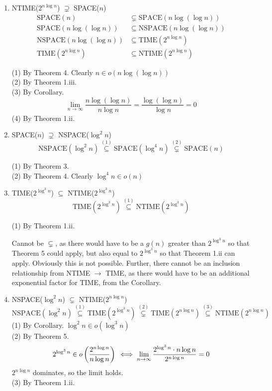 \documentclass[a4paper]{article}
\begin{document}
\begin{enumerate}[label=(\alph*)]
	\item NTIME($2^{n \log n}$) $\supsetneq$ SPACE($n$)
		\begin{align}
		\text{SPACE}(n) &\subsetneq \text{SPACE}(n\log(\log n))\\%
		\text{SPACE}(n\log(\log n))	&\subseteq \text{NSPACE}(n\log(\log n))\\%
		\text{NSPACE}(n\log(\log n)) &\subseteq \text{TIME}(2^{n\log n})\\%
		\text{TIME}(2^{n\log n}) &\subseteq \text{NTIME}(2^{n\log n})%
		\end{align}

		(1) By Theorem 4. Clearly $n \in o(n\log(\log n))$\\
		(2) By Theorem 1.iii. \\
		(3) By Corollary.
		$$
		\lim_{n \to \infty} \frac{n\log(\log n)}{n\log n} 
		= \frac{\log(\log n)}{\log n} = 0
		$$
		(4) By Theorem 1.ii.

	\item SPACE($n$) $\supsetneq$ NSPACE($\log^{2} n$)
		$$
		\text{NSPACE}(\log^2n) \overset{(1)}{\subseteq} \text{SPACE}(\log^4n)
		\overset{(2)}{\subsetneq} \text{SPACE}(n)
		$$

		(1) By Theorem 3. \\
		(2) By Theorem 4. Clearly $\log^4n \in o(n)$

	\item TIME($2^{\log^{3}n}$) $\subseteq$ NTIME($2^{\log^{3}n}$)
		$$
		\text{TIME}(2^{\log^3n})
		\overset{(1)}{\subseteq} \text{NTIME}(2^{\log^3n})
		$$

		(1) By Theorem 1.ii.

		Cannot be $\subsetneq$, as there would have to be a $g(n)$ greater than
		$2^{\log^3n}$ so that Theorem 5 could apply, but also equal to
		$2^{\log^3n}$ so that Theorem 1.ii can apply. Obviously this is not
		possible. Further, there cannot be an inclusion relationship from NTIME
		$\to$ TIME, as there would have to be an additional exponential factor
		for TIME, from the Corollary.

	\item NSPACE($\log^{2}n$) $\subsetneq$ NTIME($2^{n\log n}$)
		\setcounter{equation}{0}
		$$
		\text{NSPACE}(\log^2n) \overset{(1)}{\subseteq} \text{TIME}(2^{\log^3n})
		\overset{(2)}{\subsetneq} \text{TIME}(2^{n\log n})
		\overset{(3)}{\subseteq} \text{NTIME}(2^{n\log n})
		$$
		(1) By Corollary. $\log^2n \in o(\log^3n)$ \\
		(2) By Theorem 5.
		$$
		2^{\log^3n} \in o\left(\frac{2^{n\log n}}{n\log n}\right) \\
		\iff \lim_{n \to \infty} \frac{2^{\log^3n} \cdot n\log n}{2^{n\log n}}=0
		$$
		$2^{n\log n}$ dominates, so the limit holds. \\
		(3) By Theorem 1.ii.


\end{enumerate}
\end{document}
